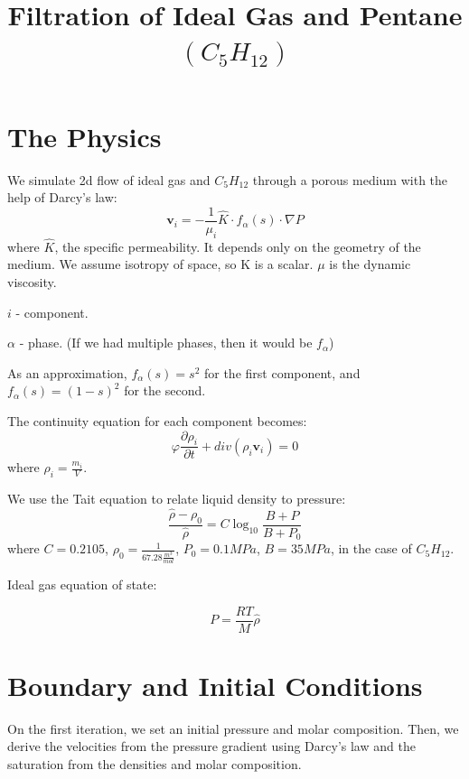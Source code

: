 \documentclass[a4paper,12pt]{article}
\author{}
\date{}
\title{Filtration of Ideal Gas and Pentane \(\left( C_5 H_{12} \right) \)}
\begin{document}
\maketitle

\section{The Physics}

We simulate 2d flow of ideal gas and \(C_5H_{12}\) through a
porous medium with the help of Darcy's law:
\begin{equation}
    \bm{v}_i = -\frac{1}{\mu_i} \hat K \cdot f_\alpha (s)
    \cdot \nabla P
\end{equation}
where \(\hat K\), the specific permeability.
It depends only on the geometry of the medium.
We assume isotropy of space, so K is a scalar.
\(\mu\) is the dynamic viscosity.

\(i\) - component.

\(\alpha\) - phase. (If we had multiple phases, then
it would be \(f_\alpha\))

As an approximation, \(f_\alpha (s) = s^2\) for the first 
component, and \(f_\alpha (s) = (1 - s)^2\) for the second.

The continuity equation for each component becomes:
\begin{equation}
    \varphi \frac{\partial \rho_i}{\partial t}
    + div (\rho_i \bm{v}_i) = 0
\end{equation}
where \(\rho_i = \frac{m_i}{V}\).

We use the Tait equation to relate liquid density to pressure:
\begin{equation}
    \frac{\hat{\rho} - \rho_0}{\hat{\rho}} = C \log_{10}
    \frac{B + P}{B + P_0}
\end{equation}
where \(C = 0.2105\),
\(\rho_0 = \frac{1}{67.28 \frac{m^3}{mol}}\),
\(P_0 = 0.1 MPa\), \(B = 35MPa\),
in the case of \(C_5H_{12}\).

Ideal gas equation of state:

\begin{equation}
    P = \frac{RT}{M} \hat{\rho}
\end{equation}

\section{Boundary and Initial Conditions}

On the first iteration, we set an initial
pressure and molar composition.
Then, we derive the velocities from the 
pressure gradient using Darcy's law and the
saturation from the densities
and molar composition.
\end{document}
